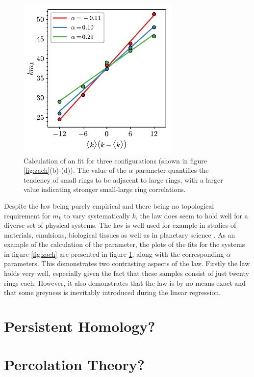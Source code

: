 \begin{figure}[tb]
     \centering
      \includegraphics[width=8cm]{./figures/methods/aw_demo.pdf}
     \caption{Calculation of an \aw{} fit for three configurations (shown in figure \ref{fig:zach}(b)\--(d)). The value of the $\alpha$ parameter quantifies the tendency of small rings to be adjacent to large rings, with a larger value indicating stronger small\--large ring correlations.}
     \label{fig:awdemo}
\end{figure}

Despite the \aw{} law being purely empirical and there being no topological requirement for $m_k$ to vary systematically $k$, the law does seem to hold well for a diverse set of physical systems.
The law is well used for example in studies of materials, emulsions, biological tissues as well as in planetary science \cite{LeRoux2013,Roy2018,Noever1992,Mombach1993,Pedro2008}.
As an example of the calculation of the \aw{} parameter, the plots of the fits for the systems in figure \ref{fig:zach} are presented in figure \ref{fig:awdemo}, along with the corresponding $\alpha$ parameters.
This demonstrates two contrasting aspects of the \aw{} law. 
Firstly the law holds very well, especially given the fact that these samples consist of just twenty rings each.
However, it also demonstrates that the law is by no means exact and that some greyness is inevitably introduced during the linear regression.

\section{Persistent Homology?}

\section{Percolation Theory?}
